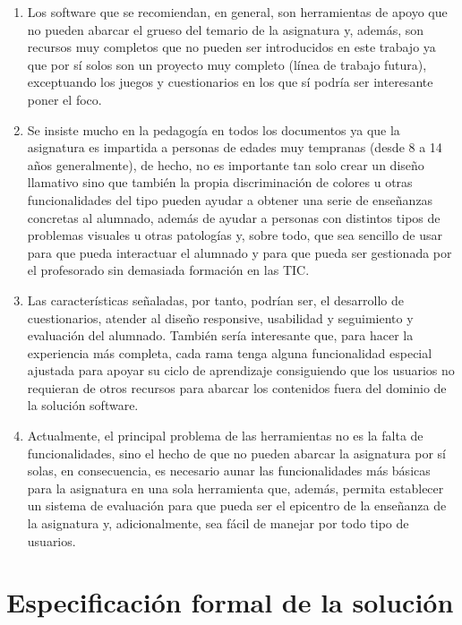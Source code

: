 \begin{enumerate}
\item Los software que se recomiendan, en general, son herramientas de apoyo que no pueden abarcar el grueso del temario de la asignatura y, además, son recursos muy completos que no pueden ser introducidos en este trabajo ya que por sí solos son un proyecto muy completo (línea de trabajo futura), exceptuando los juegos y cuestionarios en los que sí podría ser interesante poner el foco.

\item Se insiste mucho en la pedagogía en todos los documentos ya que la asignatura es impartida a personas de edades muy tempranas (desde 8 a 14 años generalmente), de hecho, no es importante tan solo crear un diseño llamativo sino que también la propia discriminación de colores u otras funcionalidades del tipo pueden ayudar a obtener una serie de enseñanzas concretas al alumnado, además de ayudar a personas con distintos tipos de problemas visuales u otras patologías y, sobre todo, que sea sencillo de usar para que pueda interactuar el alumnado y para que pueda ser gestionada por el profesorado sin demasiada formación en las TIC.

\item Las características señaladas, por tanto, podrían ser, el desarrollo de cuestionarios, atender al diseño responsive, usabilidad y seguimiento y evaluación del alumnado. También sería interesante que, para hacer la experiencia más completa, cada rama tenga alguna funcionalidad especial ajustada para apoyar su ciclo de aprendizaje consiguiendo que los usuarios no requieran de otros recursos para abarcar los contenidos fuera del dominio de la solución software.

\item Actualmente, el principal problema de las herramientas no es la falta de funcionalidades, sino el hecho de que no pueden abarcar la asignatura por sí solas, en consecuencia, es necesario aunar las funcionalidades más básicas para la asignatura en una sola herramienta que, además, permita establecer un sistema de evaluación para que pueda ser el epicentro de la enseñanza de la asignatura y, adicionalmente, sea fácil de manejar por todo tipo de usuarios.
\end{enumerate}
\newpage
\section{Especificación formal de la solución}

